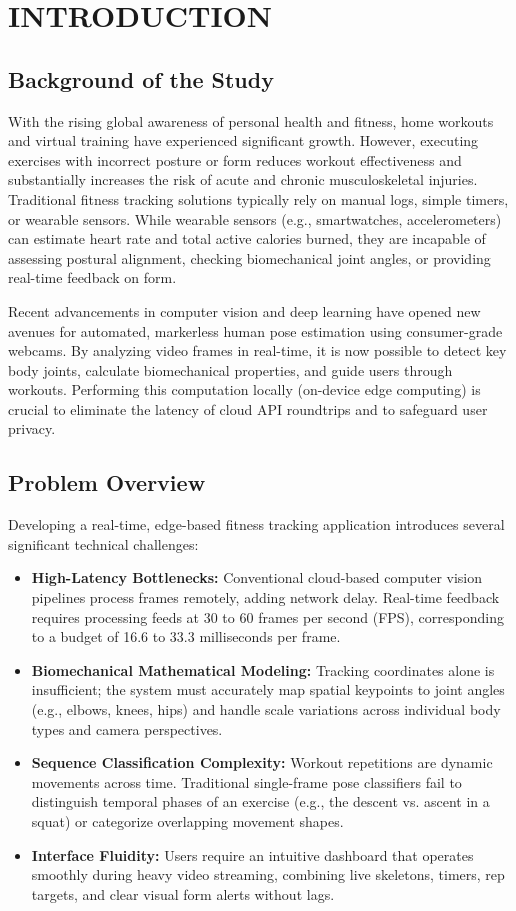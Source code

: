 \chapter{INTRODUCTION}

\section{Background of the Study}
With the rising global awareness of personal health and fitness, home workouts and virtual training have experienced significant growth. However, executing exercises with incorrect posture or form reduces workout effectiveness and substantially increases the risk of acute and chronic musculoskeletal injuries. Traditional fitness tracking solutions typically rely on manual logs, simple timers, or wearable sensors. While wearable sensors (e.g., smartwatches, accelerometers) can estimate heart rate and total active calories burned, they are incapable of assessing postural alignment, checking biomechanical joint angles, or providing real-time feedback on form. 

Recent advancements in computer vision and deep learning have opened new avenues for automated, markerless human pose estimation using consumer-grade webcams. By analyzing video frames in real-time, it is now possible to detect key body joints, calculate biomechanical properties, and guide users through workouts. Performing this computation locally (on-device edge computing) is crucial to eliminate the latency of cloud API roundtrips and to safeguard user privacy.

\section{Problem Overview}
Developing a real-time, edge-based fitness tracking application introduces several significant technical challenges:
\begin{itemize}
    \item \textbf{High-Latency Bottlenecks:} Conventional cloud-based computer vision pipelines process frames remotely, adding network delay. Real-time feedback requires processing feeds at 30 to 60 frames per second (FPS), corresponding to a budget of 16.6 to 33.3 milliseconds per frame.
    \item \textbf{Biomechanical Mathematical Modeling:} Tracking coordinates alone is insufficient; the system must accurately map spatial keypoints to joint angles (e.g., elbows, knees, hips) and handle scale variations across individual body types and camera perspectives.
    \item \textbf{Sequence Classification Complexity:} Workout repetitions are dynamic movements across time. Traditional single-frame pose classifiers fail to distinguish temporal phases of an exercise (e.g., the descent vs. ascent in a squat) or categorize overlapping movement shapes.
    \item \textbf{Interface Fluidity:} Users require an intuitive dashboard that operates smoothly during heavy video streaming, combining live skeletons, timers, rep targets, and clear visual form alerts without lags.
\end{itemize}


